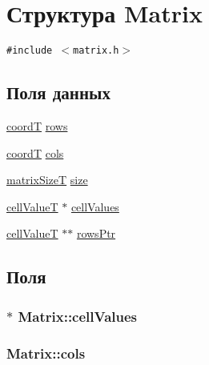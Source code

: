 \hypertarget{struct_matrix}{
\section{Структура Matrix}
\label{struct_matrix}
}
{\tt \#include $<$matrix.h$>$}

\subsection*{Поля данных}
\begin{CompactItemize}
\item 
\hyperlink{walsh__hadamard__run_2pm_2whimport_8h_f75219364b309824eef21d65e9edc43d}{coordT} \hyperlink{struct_matrix_19291f2c7f02b29d07db619d632e8724}{rows}
\item 
\hyperlink{walsh__hadamard__run_2pm_2whimport_8h_f75219364b309824eef21d65e9edc43d}{coordT} \hyperlink{struct_matrix_663ddf8a69e620daa98de627b91eb3d4}{cols}
\item 
\hyperlink{walsh__hadamard__run_2pm_2whimport_8h_7b872890b3a65c758de9e62cdf739754}{matrixSizeT} \hyperlink{struct_matrix_050f506f856b44a0deaf904489aa3afa}{size}
\item 
\hyperlink{walsh__hadamard__run_2pm_2whimport_8h_6a63c2ffcfd00315baff593b8895f32a}{cellValueT} $\ast$ \hyperlink{struct_matrix_6b8c6911e1e9dea931fc21259172d879}{cellValues}
\item 
\hyperlink{walsh__hadamard__run_2pm_2whimport_8h_6a63c2ffcfd00315baff593b8895f32a}{cellValueT} $\ast$$\ast$ \hyperlink{struct_matrix_910f11e896e007af62a3a72c3a15cf3d}{rowsPtr}
\end{CompactItemize}


\subsection{Поля}
\hypertarget{struct_matrix_6b8c6911e1e9dea931fc21259172d879}{
\subsubsection[{cellValues}]{ $\ast$ {\bf Matrix::cellValues}}}
\label{struct_matrix_6b8c6911e1e9dea931fc21259172d879}


\hypertarget{struct_matrix_663ddf8a69e620daa98de627b91eb3d4}{
\subsubsection[{cols}]{ {\bf Matrix::cols}}}
\label{struct_matrix_663ddf8a69e620daa98de627b91eb3d4}


